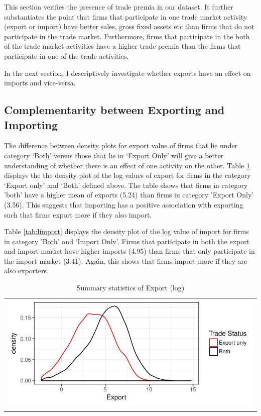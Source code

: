 \documentclass[12pt]{article}
\begin{document}
This section verifies the presence of trade premia in our
dataset. It further substantiates the point that firms that
participate in one trade market activity (export or import) have
better sales, gross fixed assets etc than firms that do not
participate in the trade market. Furthermore, firms that participate
in the both of the trade market activities have a higher trade premia
than the firms that participate in one of the trade activities. 

In the next section, I descriptively investigate whether exports have an effect
on imports and vice-versa.  

\subsection{Complementarity between Exporting and Importing}
The difference between density plots for export value of firms that
lie under category `Both'  versus those that lie in `Export Only' will
give a better understanding of whether there is an effect of one activity on the other. 
Table \ref{tab:lexport} displays the the density plot  of the log
values of export for firms in the category `Export only' and `Both'
defined above. The table shows that firms in category 'both'
 have a higher mean of exports (5.24) than firms in category 'Export
 Only' (3.56). This suggests that importing has a
positive association with exporting such that firms export more if
they also import.

Table \ref{tab:limport} displays the density plot of the log value of
import  for firms in category 'Both' and `Import Only'.
Firms that participate in both the
export and import market have higher imports (4.95) than firms that only
participate in the import market (3.41). Again, this shows that firms
import more if they are also exporters. 
\begin{center}
\begin{table}[H]
\caption{Summary statistics of Export (log)}
\label{tab:lexport}
\begin{tabular}{c}
 \includegraphics{./PICS/denslexport.pdf}   \\ 
   \\  
\end{tabular}
\end{table}
\end{center}
\end{document}
